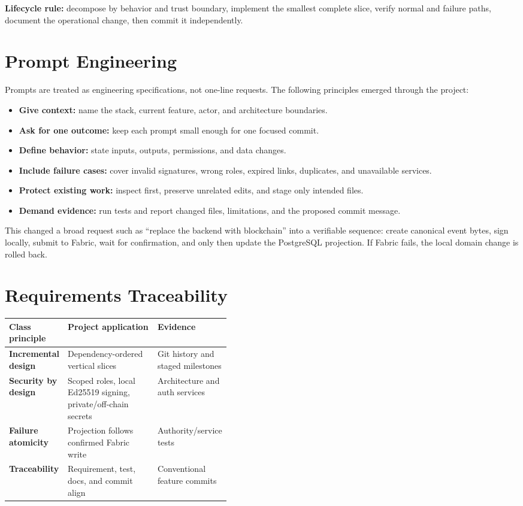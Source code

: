 \documentclass[10pt,a4paper]{article}
\newcommand{\callout}[1]{%
  \vspace{2pt}\noindent
  \colorbox{soft}{\parbox{0.965\linewidth}{\small #1}}\vspace{2pt}}
\begin{document}
\callout{\textbf{Lifecycle rule:} decompose by behavior and trust boundary, implement the smallest complete slice, verify normal and failure paths, document the operational change, then commit it independently.}

\section{Prompt Engineering}

Prompts are treated as engineering specifications, not one-line requests. The following principles emerged through the project:

\begin{itemize}
  \item \textbf{Give context:} name the stack, current feature, actor, and architecture boundaries.
  \item \textbf{Ask for one outcome:} keep each prompt small enough for one focused commit.
  \item \textbf{Define behavior:} state inputs, outputs, permissions, and data changes.
  \item \textbf{Include failure cases:} cover invalid signatures, wrong roles, expired links, duplicates, and unavailable services.
  \item \textbf{Protect existing work:} inspect first, preserve unrelated edits, and stage only intended files.
  \item \textbf{Demand evidence:} run tests and report changed files, limitations, and the proposed commit message.
\end{itemize}

This changed a broad request such as ``replace the backend with blockchain'' into a verifiable sequence: create canonical event bytes, sign locally, submit to Fabric, wait for confirmation, and only then update the PostgreSQL projection. If Fabric fails, the local domain change is rolled back.

\section{Requirements Traceability}

\begin{tabularx}{\linewidth}{>{\bfseries}p{0.19\linewidth} X >{\raggedright\arraybackslash}p{0.24\linewidth}}
Class principle & Project application & Evidence\strut \\
\hline
Incremental design & Dependency-ordered vertical slices & Git history and staged milestones \\
Security by design & Scoped roles, local Ed25519 signing, private/off-chain secrets & Architecture and auth services \\
Failure atomicity & Projection follows confirmed Fabric write & Authority/service tests \\
Traceability & Requirement, test, docs, and commit align & Conventional feature commits \\
\end{tabularx}
\end{document}
